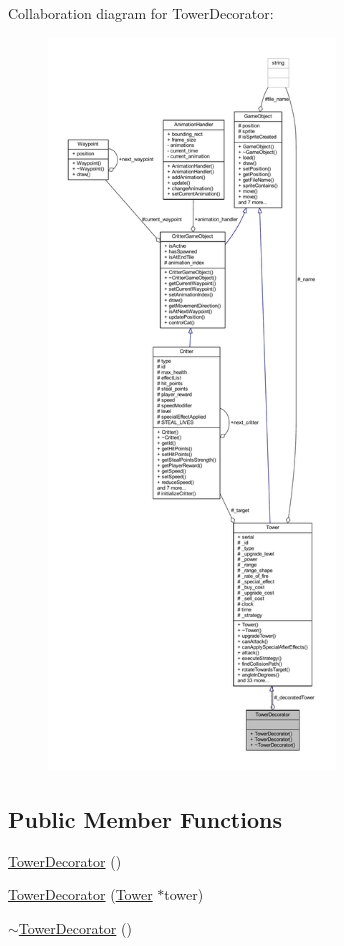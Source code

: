 Collaboration diagram for Tower\+Decorator\+:
\nopagebreak
\begin{figure}[H]
\begin{center}
\leavevmode
\includegraphics[height=550pt]{class_tower_decorator__coll__graph}
\end{center}
\end{figure}
\subsection*{Public Member Functions}
\begin{DoxyCompactItemize}
\item 
\hyperlink{class_tower_decorator_a72b2c636ae5f23d5ce4a2ef10e1f3356}{Tower\+Decorator} ()
\item 
\hyperlink{class_tower_decorator_a4de0b4daa8dc546009ffb1d86e664c4d}{Tower\+Decorator} (\hyperlink{class_tower}{Tower} $\ast$tower)
\item 
\hyperlink{class_tower_decorator_af8428d707238cc3eaeabfea3cc77c763}{$\sim$\+Tower\+Decorator} ()
\end{DoxyCompactItemize}
